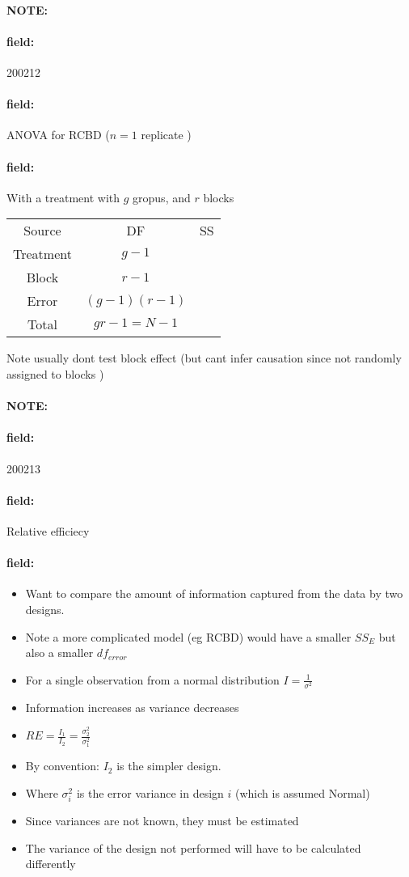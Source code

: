 \documentclass[12pt]{article}
\newenvironment{note}{\paragraph{NOTE:}}{}
\newenvironment{field}{\paragraph{field:}}{}
\begin{document}
\begin{note}
    \begin{field}
        \tiny 200212
    \end{field}
    \begin{field}
        ANOVA for RCBD ($n=1$ replicate )
    \end{field}
    \begin{field}
      With a treatment with $g$ gropus, and $r$ blocks
        \begin{tabular}{c c c }
          Source & DF & SS \\
          Treatment & $g-1$ & \\
          Block & $r-1$ &  \\
          Error & $(g-1)(r-1)$ & \\
          Total & $gr-1 = N-1$ &
        \end{tabular}

        Note usually dont test block effect (but cant infer causation since not randomly assigned to blocks )
    \end{field}
\end{note}

\begin{note}
    \begin{field}
        \tiny 200213
    \end{field}
    \begin{field}
        Relative efficiecy
    \end{field}
    \begin{field}
        \begin{itemize}
          \item Want to compare the amount of information captured from the data by two designs.
          \item Note a more complicated model (eg RCBD) would have a smaller $SS_E$ but also a smaller $df_{error}$
          \item For a single observation from a normal distribution $I = \frac{1}{\sigma^2}$
          \item Information increases as variance decreases
          \item $RE = \frac{I_1}{I_2} = \frac{\sigma_2^2}{\sigma_1^2}$
          \item By convention: $I_2$ is the simpler design.
          \item Where $\sigma_i^2$ is the error variance in design $i$ (which is assumed Normal)
          \item Since variances are not known, they must be estimated
          \item The variance of the design not performed will have to be calculated differently
        \end{itemize}
    \end{field}
\end{note}
\end{document}
